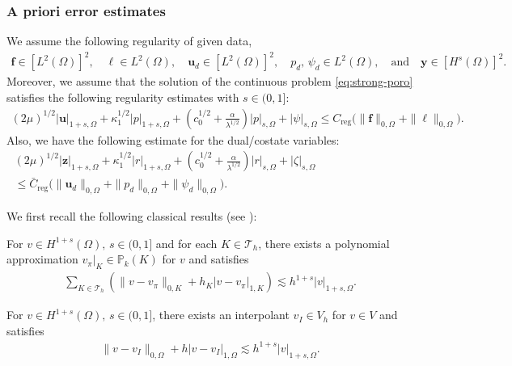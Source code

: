 \documentclass[smallextended]{svjour3}
\numberwithin{equation}{section}
\numberwithin{figure}{section}
\numberwithin{table}{section}
\newcommand\ff{\boldsymbol{f}}
\newcommand\bg{\boldsymbol{g}}
\newcommand\by{\boldsymbol{y}}
\newcommand\bu{\boldsymbol{u}}
\newcommand\bz{\boldsymbol{z}}
\newcommand\cT{\mathcal{T}}
\newcommand{\bbP}{\mathbb{P}}
\begin{document}
	\subsubsection{A priori error estimates}
	We assume the following regularity of given data,
	\begin{align*}
		\ff \in [L^2(\Omega)]^2, \quad  \ell \in L^2(\Omega), \quad  \bu_d \in [L^2(\Omega)]^2,  \quad p_d, \, \psi_d \in L^2(\Omega), \quad \text{and} \quad  \by \in [H^s(\Omega)]^2. 
	\end{align*}
	Moreover, we assume that the solution of the continuous problem \eqref{eq:strong-poro} satisfies the following regularity estimates with $s \in (0,1]$:
	\begin{align} \label{est:reg}
		(2 \mu)^{1/2} |\bu|_{1+s, \Omega} + \kappa_1^{1/2} |p|_{1+s, \Omega} + \left( c_0^{1/2} + \frac{\alpha}{\lambda^{1/2}}\right) |p|_{s, \Omega} + |\psi|_{s, \Omega} \le C_\text{reg} \big( \| \ff \|_{0, \Omega}
        + \| \ell \|_{0, \Omega} \big).
	\end{align}
    Also, we have the following estimate for the dual/costate variables:
    \begin{align} \label{est:dual-reg}
		(2 \mu)^{1/2} |\bz|_{1+s, \Omega} + \kappa_1^{1/2} |r|_{1+s, \Omega} + \left( c_0^{1/2} + \frac{\alpha}{\lambda^{1/2}}\right) |r|_{s, \Omega} + |\zeta|_{s, \Omega} \qquad \qquad \qquad \qquad   \nonumber \\
        \le \bar{C}_\text{reg} \big( \| \bu_d \|_{0, \Omega}
        + \| p_d \|_{0, \Omega} + \| \psi_d \|_{0, \Omega} \big).
	\end{align}
	
	\noindent We first recall the following classical results (see \cite{brenner08,CGPS}):
	\begin{lemma} \label{lem:polynomial}
		For $v \in H^{1+s}(\Omega), \, s \in (0,1]$ and for each $K \in \cT_h$, there exists a polynomial approximation $v_{\pi}|_K \in \bbP_k(K)$ for $v$ and satisfies
		\begin{align*}
			\sum_{K \in \cT_h} \left( \| v - v_{\pi} \|_{0,K} + h_K | v - v_{\pi} |_{1,K} \right) \lesssim h^{1+s} |v|_{1+s, \Omega}.
		\end{align*}
	\end{lemma}
	
	\begin{lemma} \label{lem:interpolant}
		 For $v \in H^{1+s}(\Omega), \, s \in (0,1]$, there exists an interpolant $v_{I} \in V_h$ for $v \in V$ and satisfies
		\begin{align*}
			\| v - v_{I} \|_{0, \Omega} + h | v - v_{I} |_{1, \Omega} \lesssim h^{1+s} |v|_{1+s, \Omega}.
		\end{align*}
	\end{lemma}
\end{document}
